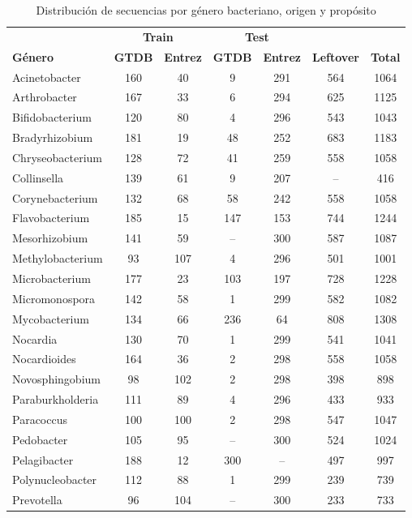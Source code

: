 \begin{table}[htbp]
\centering
\caption{Distribución de secuencias por género bacteriano, origen y propósito}
\label{tab:dataset_distribution}
\setlength{\tabcolsep}{4pt}
\renewcommand{\arraystretch}{1.2}
\begin{tabular}{l|cc|cc|c|c}
\hline
& \multicolumn{2}{c|}{\textbf{Train}} & \multicolumn{2}{c|}{\textbf{Test}} & & \\
\textbf{Género} & \textbf{GTDB} & \textbf{Entrez} & \textbf{GTDB} & \textbf{Entrez} & \textbf{Leftover} & \textbf{Total} \\
\hline
Acinetobacter & 160 & 40 & 9 & 291 & 564 & 1064 \\
Arthrobacter & 167 & 33 & 6 & 294 & 625 & 1125 \\
Bifidobacterium & 120 & 80 & 4 & 296 & 543 & 1043 \\
Bradyrhizobium & 181 & 19 & 48 & 252 & 683 & 1183 \\
Chryseobacterium & 128 & 72 & 41 & 259 & 558 & 1058 \\
Collinsella & 139 & 61 & 9 & 207 & -- & 416 \\
Corynebacterium & 132 & 68 & 58 & 242 & 558 & 1058 \\
Flavobacterium & 185 & 15 & 147 & 153 & 744 & 1244 \\
Mesorhizobium & 141 & 59 & -- & 300 & 587 & 1087 \\
Methylobacterium & 93 & 107 & 4 & 296 & 501 & 1001 \\
Microbacterium & 177 & 23 & 103 & 197 & 728 & 1228 \\
Micromonospora & 142 & 58 & 1 & 299 & 582 & 1082 \\
Mycobacterium & 134 & 66 & 236 & 64 & 808 & 1308 \\
Nocardia & 130 & 70 & 1 & 299 & 541 & 1041 \\
Nocardioides & 164 & 36 & 2 & 298 & 558 & 1058 \\
Novosphingobium & 98 & 102 & 2 & 298 & 398 & 898 \\
Paraburkholderia & 111 & 89 & 4 & 296 & 433 & 933 \\
Paracoccus & 100 & 100 & 2 & 298 & 547 & 1047 \\
Pedobacter & 105 & 95 & -- & 300 & 524 & 1024 \\
Pelagibacter & 188 & 12 & 300 & -- & 497 & 997 \\
Polynucleobacter & 112 & 88 & 1 & 299 & 239 & 739 \\
Prevotella & 96 & 104 & -- & 300 & 233 & 733 \\

\end{tabular}
\end{table}
